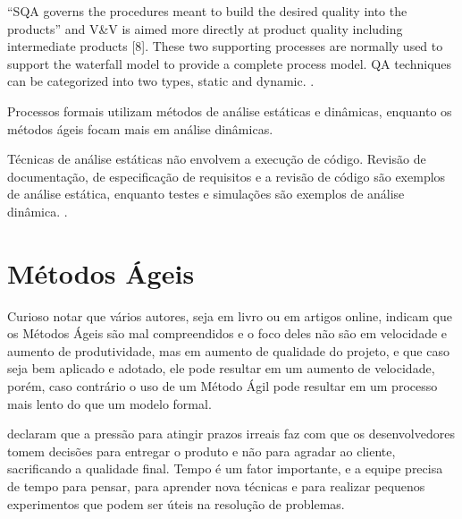 \documentclass[
	12pt,				%
	openright,			%
	oneside,			%
	a4paper,			%
	english,			%
	brazil,				%
	]{abntex2}
\begin{document}
“SQA governs the procedures meant to build the desired quality into the products” and V\&V is aimed
more directly at product quality including intermediate products [8]. These two supporting processes are normally used to support the waterfall model to provide a complete process model. QA techniques can be categorized into two types, static and dynamic. \cite{Huo:2004:SQA:1025117.1025549}. %

Processos formais utilizam métodos de análise estáticas e dinâmicas, enquanto os métodos ágeis focam mais em análise dinâmicas.

Técnicas de análise estáticas não envolvem a execução de código. Revisão de documentação, de especificação de requisitos e a revisão de código são exemplos de análise estática, enquanto testes e simulações são exemplos de análise dinâmica. \cite{Huo:2004:SQA:1025117.1025549}. %

\section{Métodos Ágeis}


Curioso notar que vários autores, seja em livro ou em artigos online, indicam que os Métodos Ágeis são mal compreendidos e o foco deles não são em velocidade e aumento de produtividade, mas em aumento de qualidade do projeto, e que caso seja bem aplicado e adotado, ele pode resultar em um aumento de velocidade, porém, caso contrário o uso de um Método Ágil pode resultar em um processo mais lento do que um modelo formal. \cite{galen2015} %

 declaram que a pressão para atingir prazos irreais faz com que os desenvolvedores tomem decisões para entregar o produto e não para agradar ao cliente, sacrificando a qualidade final. Tempo é um fator importante, e a equipe precisa de tempo para pensar, para aprender nova técnicas e para realizar pequenos experimentos que podem ser úteis na resolução de problemas.
\end{document}

